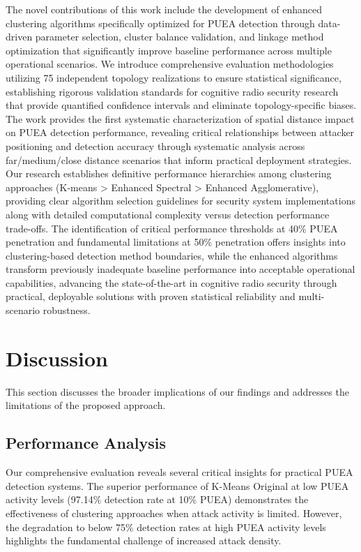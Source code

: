 \documentclass[pdflatex,sn-mathphys-num]{sn-jnl}%
\theoremstyle{thmstyleone}
\theoremstyle{thmstyletwo}
\theoremstyle{thmstylethree}
\begin{document}
The novel contributions of this work include the development of enhanced clustering algorithms specifically optimized for PUEA detection through data-driven parameter selection, cluster balance validation, and linkage method optimization that significantly improve baseline performance across multiple operational scenarios. We introduce comprehensive evaluation methodologies utilizing 75 independent topology realizations to ensure statistical significance, establishing rigorous validation standards for cognitive radio security research that provide quantified confidence intervals and eliminate topology-specific biases. The work provides the first systematic characterization of spatial distance impact on PUEA detection performance, revealing critical relationships between attacker positioning and detection accuracy through systematic analysis across far/medium/close distance scenarios that inform practical deployment strategies. Our research establishes definitive performance hierarchies among clustering approaches (K-means > Enhanced Spectral > Enhanced Agglomerative), providing clear algorithm selection guidelines for security system implementations along with detailed computational complexity versus detection performance trade-offs. The identification of critical performance thresholds at 40\% PUEA penetration and fundamental limitations at 50\% penetration offers insights into clustering-based detection method boundaries, while the enhanced algorithms transform previously inadequate baseline performance into acceptable operational capabilities, advancing the state-of-the-art in cognitive radio security through practical, deployable solutions with proven statistical reliability and multi-scenario robustness.


\section{Discussion}\label{sec8}

This section discusses the broader implications of our findings and addresses the limitations of the proposed approach.

\subsection{Performance Analysis}

Our comprehensive evaluation reveals several critical insights for practical PUEA detection systems. The superior performance of K-Means Original at low PUEA activity levels (97.14\% detection rate at 10\% PUEA) demonstrates the effectiveness of clustering approaches when attack activity is limited. However, the degradation to below 75\% detection rates at high PUEA activity levels highlights the fundamental challenge of increased attack density.
\end{document}
